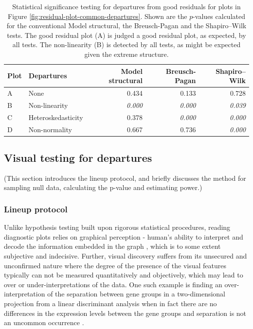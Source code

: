 \documentclass[]{interact}
\theoremstyle{plain}%
\theoremstyle{definition}
\theoremstyle{remark}
\begin{document}
\begin{table}

\caption{\label{tab:example-residual-plot-table}Statistical significance testing for departures from good residuals for plots in Figure \ref{fig:residual-plot-common-departures}. Shown are the $p$-values calculated for the conventional Model structural, the Breusch-Pagan and the Shapiro–Wilk tests. The good residual plot (A) is judged a good residual plot, as expected, by all tests. The non-linearity (B) is detected by all tests, as might be expected given the extreme structure.}
\centering
\begin{tabular}[t]{llrrr}
\toprule
Plot & Departures & Model structural & Breusch-Pagan & Shapiro–Wilk\\
\midrule
A & None & 0.434 & 0.133 & 0.728\\
B & Non-linearity & \em{0.000} & \em{0.000} & \em{0.039}\\
C & Heteroskedasticity & 0.378 & \em{0.000} & \em{0.000}\\
D & Non-normality & 0.667 & 0.736 & \em{0.000}\\
\bottomrule
\end{tabular}
\end{table}

\hypertarget{visual-testing-for-departures}{%
\subsection{Visual testing for
departures}\label{visual-testing-for-departures}}

(This section introduces the lineup protocol, and briefly discusses the
method for sampling null data, calculating the p-value and estimating
power.)

\hypertarget{lineup-protocol}{%
\subsubsection{Lineup protocol}\label{lineup-protocol}}

Unlike hypothesis testing built upon rigorous statistical procedures,
reading diagnostic plots relies on graphical perception - human's
ability to interpret and decode the information embedded in the graph
\citep{cleveland_graphical_1984}, which is to some extent subjective and
indecisive. Further, visual discovery suffers from its unsecured and
unconfirmed nature where the degree of the presence of the visual
features typically can not be measured quantitatively and objectively,
which may lead to over or under-interpretations of the data. One such
example is finding an over-interpretation of the separation between gene
groups in a two-dimensional projection from a linear discriminant
analysis when in fact there are no differences in the expression levels
between the gene groups and separation is not an uncommon occurrence
\citep{roy_chowdhury_using_2015}.
\end{document}
